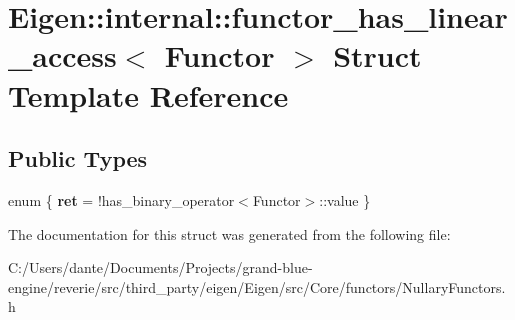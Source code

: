 \hypertarget{struct_eigen_1_1internal_1_1functor__has__linear__access}{}\section{Eigen\+::internal\+::functor\+\_\+has\+\_\+linear\+\_\+access$<$ Functor $>$ Struct Template Reference}
\label{struct_eigen_1_1internal_1_1functor__has__linear__access}
\subsection*{Public Types}
\begin{DoxyCompactItemize}
\item 
\mbox{\label{struct_eigen_1_1internal_1_1functor__has__linear__access_a0bf028ef804247fc6d576d6e932a6535}} 
enum \{ {\bfseries ret} = !has\+\_\+binary\+\_\+operator$<$Functor$>$\+::value
 \}
\end{DoxyCompactItemize}


The documentation for this struct was generated from the following file\+:\begin{DoxyCompactItemize}
\item 
C\+:/\+Users/dante/\+Documents/\+Projects/grand-\/blue-\/engine/reverie/src/third\+\_\+party/eigen/\+Eigen/src/\+Core/functors/Nullary\+Functors.\+h\end{DoxyCompactItemize}
